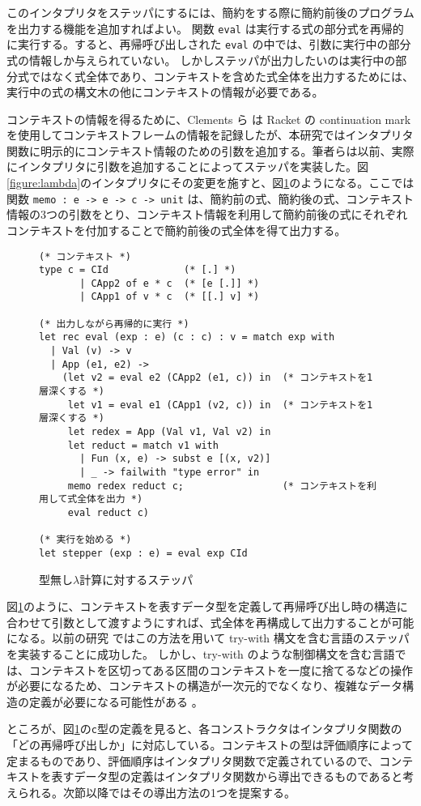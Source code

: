 このインタプリタをステッパにするには、簡約をする際に簡約前後のプログラムを出力する機能を追加すればよい。
関数 \texttt{eval} は実行する式の部分式を再帰的に実行する。すると、再帰呼び出しされた \texttt{eval} の中では、引数に実行中の部分式の情報しか与えられていない。
しかしステッパが出力したいのは実行中の部分式ではなく式全体であり、コンテキストを含めた式全体を出力するためには、実行中の式の構文木の他にコンテキストの情報が必要である。

コンテキストの情報を得るために、Clements ら\cite{clements01} は Racket の continuation mark を使用してコンテキストフレームの情報を記録したが、本研究ではインタプリタ関数に明示的にコンテキスト情報のための引数を追加する。筆者らは以前\cite{FCA19}、実際にインタプリタに引数を追加することによってステッパを実装した。図\ref{figure:lambda}のインタプリタにその変更を施すと、図\ref{figure:lambda_stepper}のようになる。ここでは関数 \texttt{memo :\ e -> e -> c -> unit} は、簡約前の式、簡約後の式、コンテキスト情報の3つの引数をとり、コンテキスト情報を利用して簡約前後の式にそれぞれコンテキストを付加することで簡約前後の式全体を得て出力する。

\begin{figure}
\begin{verbatim}
(* コンテキスト *)
type c = CId             (* [.] *)
       | CApp2 of e * c  (* [e [.]] *)
       | CApp1 of v * c  (* [[.] v] *)

(* 出力しながら再帰的に実行 *)
let rec eval (exp : e) (c : c) : v = match exp with
  | Val (v) -> v
  | App (e1, e2) ->
    (let v2 = eval e2 (CApp2 (e1, c)) in  (* コンテキストを1層深くする *)
     let v1 = eval e1 (CApp1 (v2, c)) in  (* コンテキストを1層深くする *)
     let redex = App (Val v1, Val v2) in
     let reduct = match v1 with
       | Fun (x, e) -> subst e [(x, v2)]
       | _ -> failwith "type error" in
     memo redex reduct c;                 (* コンテキストを利用して式全体を出力 *)
     eval reduct c)

(* 実行を始める *)
let stepper (exp : e) = eval exp CId
\end{verbatim}
\caption{型無し$\lambda$計算に対するステッパ}
\label{figure:lambda_stepper}
\end{figure}

図\ref{figure:lambda_stepper}のように、コンテキストを表すデータ型を定義して再帰呼び出し時の構造に合わせて引数として渡すようにすれば、式全体を再構成して出力することが可能になる。以前の研究 \cite{FCA19} ではこの方法を用いて try-with 構文を含む言語のステッパを実装することに成功した。
しかし、try-with のような制御構文を含む言語では、コンテキストを区切ってある区間のコンテキストを一度に捨てるなどの操作が必要になるため、コンテキストの構造が一次元的でなくなり、複雑なデータ構造の定義が必要になる可能性がある \cite{FCA19} 。

ところが、図\ref{figure:lambda_stepper}の\texttt{c}型の定義を見ると、各コンストラクタはインタプリタ関数の「どの再帰呼び出しか」に対応している。コンテキストの型は評価順序によって定まるものであり、評価順序はインタプリタ関数で定義されているので、コンテキストを表すデータ型の定義はインタプリタ関数から導出できるものであると考えられる。次節以降ではその導出方法の1つを提案する。
